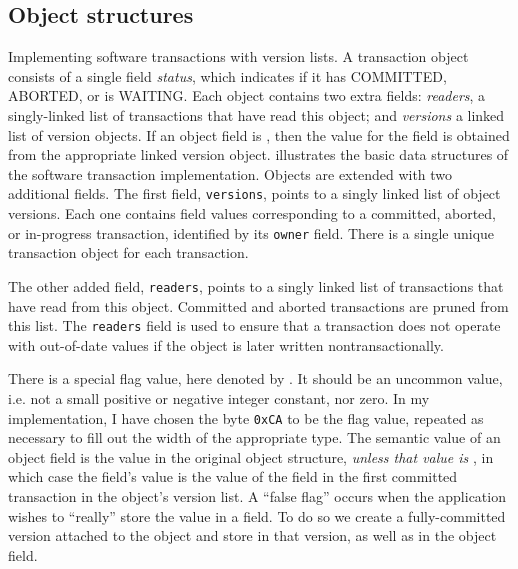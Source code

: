 \subsection{Object structures}%
%
 {Implementing software transactions with version
  lists.  A transaction object consists of a single field {\it
    status}, which indicates if it has COMMITTED, ABORTED, or is WAITING.
  Each object contains two extra fields: {\it readers}, a
  singly-linked list of transactions that have read this object; and
  {\it versions} a linked list of version objects.  If an object field
  is \FLAG, then the value for the field is obtained from the
  appropriate linked version object.}
 illustrates the basic data structures of the \apex
software transaction implementation.  Objects are extended with two
additional fields.  The first field, {\tt versions}, points to a
singly linked list of object versions.  Each one contains field values
corresponding to a committed, aborted, or in-progress transaction,
identified by its {\tt owner} field.  There is a single unique
transaction object for each transaction.

The other added field, {\tt readers}, points to a singly linked list
of transactions that have read from this object.  Committed and
aborted transactions are pruned from this list.  The {\tt readers}
field is used to ensure that a transaction does not operate with
out-of-date values if the object is later written
nontransactionally.

There is a special flag value, here denoted by \FLAG.  It should be
an uncommon value, i.e. not a small positive or negative integer
constant, nor zero.  In my implementation, I have chosen the byte
\texttt{0xCA} to be the flag value, repeated as necessary to fill out
the width of the appropriate type.
The semantic value of an object field is the value in the original
object structure, \emph{unless that value is \FLAG}, in which
case the field's value is the value of the field in the first
committed transaction in the object's version list.  A ``false flag''
occurs when the application wishes to ``really'' store the value \FLAG
in a field. To do so we create a fully-committed version
attached to the object and store \FLAG in that version, as well as in
the object field.\label{pg:falseflag}

